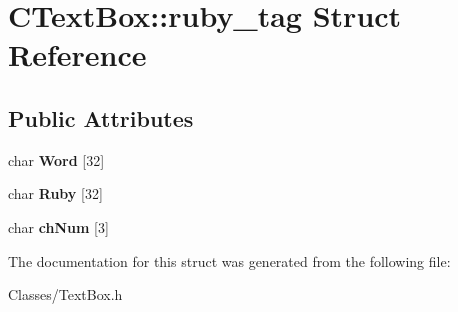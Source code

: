 \hypertarget{struct_c_text_box_1_1ruby__tag}{}\section{C\+Text\+Box\+:\+:ruby\+\_\+tag Struct Reference}
\label{struct_c_text_box_1_1ruby__tag}
\subsection*{Public Attributes}
\begin{DoxyCompactItemize}
\item 
char {\bfseries Word} \mbox{[}32\mbox{]}\hypertarget{struct_c_text_box_1_1ruby__tag_a29e36b52fd55c8e1807c9d2b9a938772}{}\label{struct_c_text_box_1_1ruby__tag_a29e36b52fd55c8e1807c9d2b9a938772}

\item 
char {\bfseries Ruby} \mbox{[}32\mbox{]}\hypertarget{struct_c_text_box_1_1ruby__tag_a9ba237f4d6dccde17904b2310194364c}{}\label{struct_c_text_box_1_1ruby__tag_a9ba237f4d6dccde17904b2310194364c}

\item 
char {\bfseries ch\+Num} \mbox{[}3\mbox{]}\hypertarget{struct_c_text_box_1_1ruby__tag_aeeb75c45699d70f39ffd7b43531f84f3}{}\label{struct_c_text_box_1_1ruby__tag_aeeb75c45699d70f39ffd7b43531f84f3}

\end{DoxyCompactItemize}


The documentation for this struct was generated from the following file\+:\begin{DoxyCompactItemize}
\item 
Classes/Text\+Box.\+h\end{DoxyCompactItemize}
